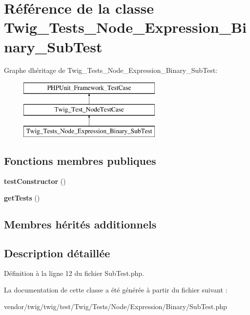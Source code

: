 \hypertarget{class_twig___tests___node___expression___binary___sub_test}{}\section{Référence de la classe Twig\+\_\+\+Tests\+\_\+\+Node\+\_\+\+Expression\+\_\+\+Binary\+\_\+\+Sub\+Test}
\label{class_twig___tests___node___expression___binary___sub_test}
Graphe d\textquotesingle{}héritage de Twig\+\_\+\+Tests\+\_\+\+Node\+\_\+\+Expression\+\_\+\+Binary\+\_\+\+Sub\+Test\+:\begin{figure}[H]
\begin{center}
\leavevmode
\includegraphics[height=3.000000cm]{class_twig___tests___node___expression___binary___sub_test}
\end{center}
\end{figure}
\subsection*{Fonctions membres publiques}
\begin{DoxyCompactItemize}
\item 
{\bfseries test\+Constructor} ()\hypertarget{class_twig___tests___node___expression___binary___sub_test_a47094dc941e72950570900d1418f89c6}{}\label{class_twig___tests___node___expression___binary___sub_test_a47094dc941e72950570900d1418f89c6}

\item 
{\bfseries get\+Tests} ()\hypertarget{class_twig___tests___node___expression___binary___sub_test_a7e247dd31cc8d37a6c97353a062a0080}{}\label{class_twig___tests___node___expression___binary___sub_test_a7e247dd31cc8d37a6c97353a062a0080}

\end{DoxyCompactItemize}
\subsection*{Membres hérités additionnels}


\subsection{Description détaillée}


Définition à la ligne 12 du fichier Sub\+Test.\+php.



La documentation de cette classe a été générée à partir du fichier suivant \+:\begin{DoxyCompactItemize}
\item 
vendor/twig/twig/test/\+Twig/\+Tests/\+Node/\+Expression/\+Binary/Sub\+Test.\+php\end{DoxyCompactItemize}
